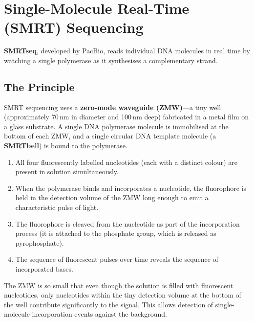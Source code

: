 \section{Single-Molecule Real-Time (SMRT) Sequencing}
\label{sec:seqprinciples:smrt}

\textbf{\Acrfull{SMRTseq}}, developed by \acrfull{PacBio}, reads individual DNA molecules in real time by watching a single polymerase as it synthesises a complementary strand.

\subsection{The Principle}
\label{subsec:seqprinciples:smrt-principle}

SMRT sequencing uses a \textbf{zero-mode waveguide (ZMW)}---a tiny well (approximately 70\,nm in diameter and 100\,nm deep) fabricated in a metal film on a glass substrate. A single DNA polymerase molecule is immobilised at the bottom of each ZMW, and a single circular DNA template molecule (a \textbf{SMRTbell}) is bound to the polymerase.

\begin{enumerate}[itemsep=2pt]
  \item All four fluorescently labelled nucleotides (each with a distinct colour) are present in solution simultaneously.
  \item When the polymerase binds and incorporates a nucleotide, the fluorophore is held in the detection volume of the ZMW long enough to emit a characteristic pulse of light.
  \item The fluorophore is cleaved from the nucleotide as part of the incorporation process (it is attached to the phosphate group, which is released as pyrophosphate).
  \item The sequence of fluorescent pulses over time reveals the sequence of incorporated bases.
\end{enumerate}

The ZMW is so small that even though the solution is filled with fluorescent nucleotides, only nucleotides within the tiny detection volume at the bottom of the well contribute significantly to the signal. This allows detection of single-molecule incorporation events against the background.

